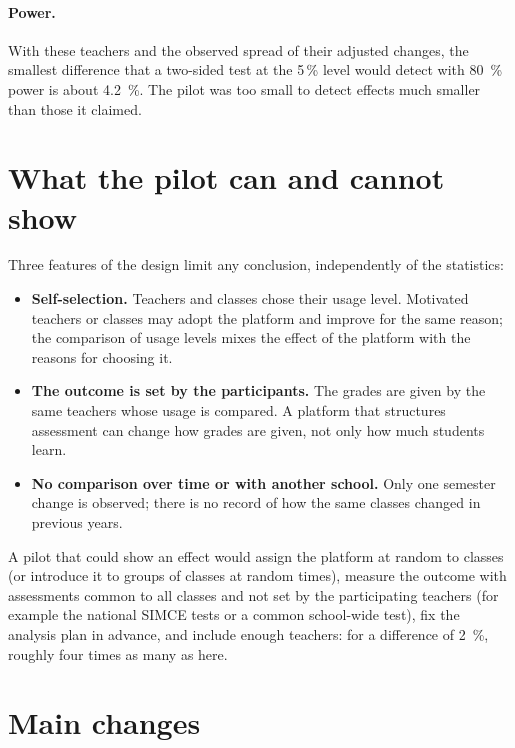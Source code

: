 \documentclass[11pt,a4paper]{article}
\begin{document}
\paragraph{Power.} With these teachers and the observed spread of their adjusted changes, the smallest difference
that a two-sided test at the 5\,\% level would detect with \SI{80}{\percent} power is about \SI{4.2}{\percent}. The
pilot was too small to detect effects much smaller than those it claimed.

\section{What the pilot can and cannot show}\label{sec:limits}

Three features of the design limit any conclusion, independently of the statistics:
\begin{itemize}
  \item \textbf{Self-selection.} Teachers and classes chose their usage level. Motivated teachers or classes may
    adopt the platform and improve for the same reason; the comparison of usage levels mixes the effect of the
    platform with the reasons for choosing it.
  \item \textbf{The outcome is set by the participants.} The grades are given by the same teachers whose usage is
    compared. A platform that structures assessment can change how grades are given, not only how much students learn.
  \item \textbf{No comparison over time or with another school.} Only one semester change is observed; there is no
    record of how the same classes changed in previous years.
\end{itemize}
A pilot that could show an effect would assign the platform at random to classes (or introduce it to groups of
classes at random times), measure the outcome with assessments common to all classes and not set by the participating
teachers (for example the national SIMCE tests or a common school-wide test), fix the analysis plan in advance, and
include enough teachers: for a difference of \SI{2}{\percent}, roughly four times as many as here.

\section{Main changes}\label{sec:changes}
\end{document}
